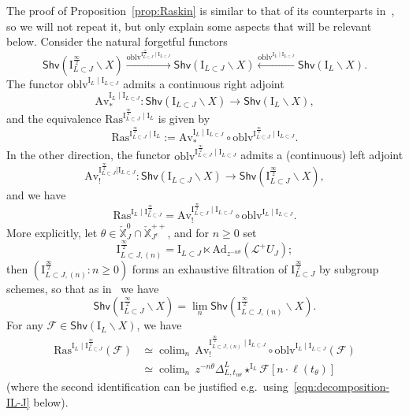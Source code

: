 \documentclass[11pt]{amsart}
\numberwithin{equation}{section}
\theoremstyle{plain}
\theoremstyle{definition}
\newcommand{\sF}{{\mathcal F}}
\newcommand{\I}{{\mathrm I}}
\newcommand{\sL}{{\mathcal L}}
\newcommand{\X}{{\mathbb X}}
\newcommand{\Xd}{\check{\X}}
\newcommand{\Ad}{\mathrm{Ad}}
\newcommand{\semi}{{{\frac{\infty}{2}}}}
\newcommand{\quar}{{{\frac{\infty}{4}}}}
\newcommand{\oblv}{\mathrm{oblv}}
\newcommand{\Av}{\mathrm{Av}}
\newcommand{\Shv}{\mathsf{Shv}}
\newcommand{\Ras}{\mathrm{Ras}}
\newcommand{\comp}{\mathrm{c}}
\DeclareMathOperator*{\colim}{colim}
\begin{document}
The proof of Proposition~\ref{prop:Raskin} is similar to that of its counterparts in~\cite{Gaits18,DL23,adr}, so we will not repeat it, but only explain some aspects that will be relevant below.
Consider the natural forgetful functors 
\[
\Shv \left( \I_{L \subset J}^{\semi} \backslash X \right) \xrightarrow{\oblv^{\I_{L \subset J}^{\semi} \mid \I_{L \subset J}}} 
\Shv \left( \I_{L \subset J} \backslash X \right) \xleftarrow{\oblv^{\I_L \mid \I_{L \subset J}}}
\Shv \left( \I_L \backslash X \right). 
\]
The functor $\oblv^{\I_L \mid \I_{L \subset J}}$ admits a continuous right adjoint 
\[
\Av^{\I_L \mid \I_{L \subset J}}_*: \Shv(\I_{L \subset J}\backslash X)\rightarrow \Shv(\I_L \backslash X),
\]
and the equivalence $\Ras^{\I_{L \subset J}^{\semi} \mid \I_L}$ is given by 
\[
\Ras^{\I_{L \subset J}^{\semi} \mid \I_L} := \Av^{\I_L \mid \I_{L \subset J}}_*  \circ  \oblv^{\I_{L \subset J}^{\semi} \mid \I_{L \subset J}}. 
\]
In the other direction, the functor $\oblv^{\I_{L \subset J}^{\semi} \mid \I_{L \subset J}}$ admits a (continuous) left adjoint 
\[
\Av_!^{\I_{L \subset J}^{\semi} | \I_{L \subset J}}: \Shv \left( \I_{L \subset J}\backslash X \right) \to \Shv \left( \I_{L \subset J}^{\semi} \backslash X \right),
\]
and we have 
\[
\Ras^{\I_L \mid \I_{L \subset J}^{\semi}} = 
\Av^{\I_{L \subset J}^{\semi} \mid \I_{L \subset J}}_! \circ \oblv^{\I_L \mid \I_{L \subset J}}. 
\]
More explicitly, 
let $\theta\in \Xd_J^0 \cap \Xd_{J^\comp}^{++}$, and for $n \geq 0$ set 
\[
\I_{L \subset J,(n)}^{\semi}=\I_{L \subset J}\ltimes \Ad_{z^{-n\theta}}(\sL^+U_{J});
\]
then $( \I_{L \subset J,(n)}^{\semi} : n \geq 0)$ forms an exhaustive filtration of $\I_{L \subset J}^{\semi}$ by subgroup schemes, so that as in~\cite[\S 2.6]{adr} we have
\[
\Shv \left( \I_{L \subset J}^{\semi} \backslash X \right) = \lim_n \Shv \left( \I_{L \subset J, (n)}^{\semi} \backslash X \right).
\]
For any $\sF\in \Shv(\I_L \backslash X)$, we have 
\begin{equation}
\label{eq:Raskin-formula}
\begin{aligned}
\Ras^{\I_L \mid \I_{L \subset J}^{\semi}}(\sF)
&\simeq \colim_{n} \, \Av^{\I_{L \subset J,(n)}^{\semi} \mid \I_{L \subset J}}_!\circ \oblv^{\I_L \mid \I_{L \subset J}}(\sF) \\
&\simeq \colim_{n} \, z^{-n\theta} \Delta^L_{L,t_{n\theta}} \star^{\I_L} \sF [n\cdot \ell(t_{\theta})]
\end{aligned}
\end{equation}
(where the second identification can be justified e.g.~using~\eqref{eqn:decomposition-IL-J} below).
\end{document}
